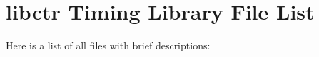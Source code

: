 \section{libctr Timing Library File List}
Here is a list of all files with brief descriptions:\begin{CompactList}
\item{}
\end{CompactList}
